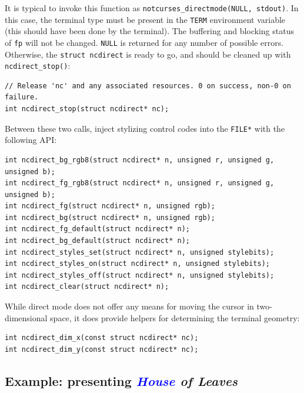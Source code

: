 \documentclass[letterpaper,10pt]{article}
\begin{document}
It is typical to invoke this function as \texttt{notcurses\_directmode(NULL, stdout)}.
In this case, the terminal type must be present in the \texttt{TERM} environment
variable (this should have been done by the terminal). The buffering and
blocking status of \texttt{fp} will not be changed. \texttt{NULL} is returned for any number
of possible errors. Otherwise, the \texttt{struct ncdirect} is ready to go, and should
be cleaned up with \texttt{ncdirect\_stop()}:

\begin{listing}[ht]
\begin{verbatim}
// Release 'nc' and any associated resources. 0 on success, non-0 on failure.
int ncdirect_stop(struct ncdirect* nc);
\end{verbatim}
\end{listing}

Between these two calls, inject stylizing control codes into the \texttt{FILE*} with
the following API:

\begin{listing}[ht]
\begin{verbatim}
int ncdirect_bg_rgb8(struct ncdirect* n, unsigned r, unsigned g, unsigned b);
int ncdirect_fg_rgb8(struct ncdirect* n, unsigned r, unsigned g, unsigned b);
int ncdirect_fg(struct ncdirect* n, unsigned rgb);
int ncdirect_bg(struct ncdirect* n, unsigned rgb);
int ncdirect_fg_default(struct ncdirect* n);
int ncdirect_bg_default(struct ncdirect* n);
int ncdirect_styles_set(struct ncdirect* n, unsigned stylebits);
int ncdirect_styles_on(struct ncdirect* n, unsigned stylebits);
int ncdirect_styles_off(struct ncdirect* n, unsigned stylebits);
int ncdirect_clear(struct ncdirect* n);
\end{verbatim}
\end{listing}

While direct mode does not offer any means for moving the cursor in
two-dimensional space, it does provide helpers for determining the terminal
geometry:

\begin{verbatim}
int ncdirect_dim_x(const struct ncdirect* nc);
int ncdirect_dim_y(const struct ncdirect* nc);
\end{verbatim}

\subsection{Example: presenting \textit{\textcolor{blue}{House} of Leaves}}
\end{document}
